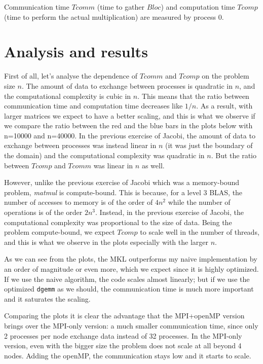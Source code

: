 \documentclass[12pt]{extarticle}
\begin{document}
Communication time $Tcomm$ (time to gather $Bloc$) and computation time $Tcomp$ (time to perform the actual multiplication) are measured by process 0.



\section*{Analysis and results}  %
First of all, let's analyse the dependence of $Tcomm$ and $Tcomp$ on the problem size $n$. The amount of data to exchange between processes is quadratic in $n$, and the computational complexity is cubic in $n$. This means that the ratio between communication time and computation time decreases like $1/n$. As a result, with larger matrices we expect to have a better scaling, and this is what we observe if we compare the ratio between the red and the blue bars in the plots below with n=10000 and n=40000.
In the previous exercise of Jacobi, the amount of data to exchange between processes was instead linear in $n$ (it was just the boundary of the domain) and the computational complexity was quadratic in $n$. But the ratio between $Tcomp$ and $Tcomm$ was linear in $n$ as well.

However, unlike the previous exercise of Jacobi which was a memory-bound problem, \textit{matmul} is compute-bound. This is because, for a level 3 BLAS, the number of accesses to memory is of the order of $4n^2$ while the number of operations is of the order $2n^3$. Instead, in the previous exercise of Jacobi, the computational complexity was proportional to the size of data. Being the problem compute-bound, we expect $Tcomp$ to scale well in the number of threads, and this is what we observe in the plots especially with the larger $n$.


As we can see from the plots, the MKL outperforms my naive implementation by an order of magnitude or even more, which we expect since it is highly optimized. If we use the naive algorithm, the code scales almost linearly; but if we use the optimized \texttt{dgemm} as we should, the communication time is much more important and it saturates the scaling.

Comparing the plots it is clear the advantage that the MPI+openMP version brings over the MPI-only version: a much smaller communication time, since only 2 processes per node exchange data instead of 32 processes.
In the MPI-only version, even with the bigger size the problem does not scale at all beyond 4 nodes. Adding the openMP, the communication stays low and it starts to scale.
\end{document}
